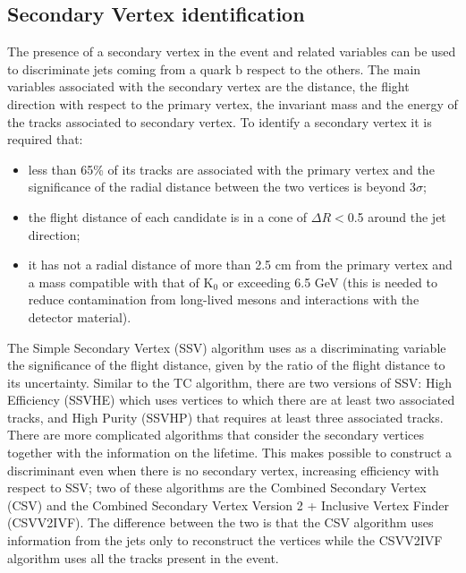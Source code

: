 \subsection*{Secondary Vertex identification}
The presence of a
secondary vertex in the event and related variables  can be used
to discriminate jets coming from a quark b respect to the others. The main variables associated with the secondary vertex are the distance, the flight direction
with respect to the primary vertex, the invariant mass and the energy of the tracks associated to 
secondary vertex. To identify a secondary vertex it is required that:
\begin{itemize}
\item less than 65\% of its tracks are associated with the primary vertex and
the significance of the radial distance between the two vertices is beyond 3$\sigma$;
\item the flight distance of each candidate is in a cone of $\Delta R <$0.5 around
the jet direction;
\item it has not a radial distance of more than 2.5 cm from the primary vertex and a mass compatible with
that of K$_0$ or exceeding 6.5 GeV (this is needed to reduce contamination from long-lived mesons and interactions with the detector material).
\end{itemize}
The Simple Secondary Vertex (SSV) algorithm uses as a discriminating variable 
the significance of the flight distance, given by the ratio of the flight distance to its uncertainty. 
Similar to the TC algorithm, there are two versions
of SSV: High Efficiency (SSVHE) which uses vertices to which there are at least
two associated tracks, and High Purity (SSVHP) that requires at least three associated tracks.
There are more complicated algorithms that consider the secondary vertices together with the
information on the lifetime. This makes possible to construct a discriminant
even when there is no secondary vertex, increasing efficiency with respect to 
SSV; two of these algorithms are the Combined Secondary Vertex (CSV) and the
Combined Secondary Vertex Version 2 + Inclusive Vertex Finder (CSVV2IVF).
The difference between the two is that the CSV algorithm uses information from the jets only to reconstruct the vertices while the CSVV2IVF algorithm uses
all the tracks present in the event.

